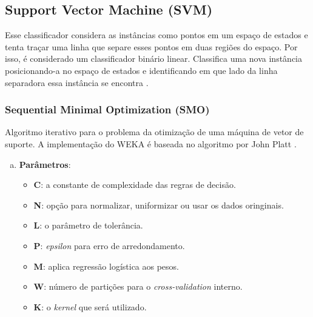 \subsection{Support Vector Machine (SVM)}

Esse classificador considera as instâncias como pontos em um espaço de estados e tenta traçar uma linha que separe esses pontos em duas regiões do espaço. Por isso, é considerado um classificador binário linear. Classifica uma nova instância posicionando-a no espaço de estados e identificando em que lado da linha separadora essa instância se encontra \cite{Cortes1995}.

\subsubsection{Sequential Minimal Optimization (SMO)}

Algoritmo iterativo para o problema da otimização de uma máquina de vetor de suporte. A implementação do WEKA é baseada no algoritmo por John Platt \cite{Platt1998}.

\begin{enumerate}[a)]
    \item \textbf{Parâmetros}:
        \begin{itemize}

            \item \textbf{C}: a constante de complexidade das regras de decisão.

            \item \textbf{N}: opção para normalizar, uniformizar ou usar os dados oringinais.

            \item \textbf{L}: o parâmetro de tolerância.

            \item \textbf{P}: \emph{epsilon} para erro de arredondamento.

            \item \textbf{M}: aplica regressão logística aos pesos.

            \item \textbf{W}: número de partições para o \emph{cross-validation} interno.

            \item \textbf{K}: o \emph{kernel} que será utilizado.
        \end{itemize}
\end{enumerate}

